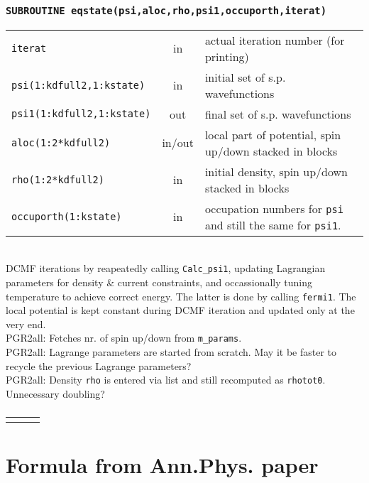 \documentclass[final,1p]{elsarticle}
\newcommand{\PGRcomm}[1]{{\color{blue}\small PGR2all: #1}}
\begin{document}
\subsubsection*{\tt SUBROUTINE eqstate(psi,aloc,rho,psi1,occuporth,iterat)}
\begin{tabular}{lcl}
 {\tt iterat} & in & actual iteration number (for printing)\\
 {\tt psi(1:kdfull2,1:kstate)} & in & initial set of
 s.p. wavefunctions\\
 {\tt psi1(1:kdfull2,1:kstate)} & out & final set of s.p. wavefunctions\\
 {\tt aloc(1:2*kdfull2)} & in/out & local part of potential, spin
 up/down stacked in blocks\\
 {\tt rho(1:2*kdfull2)} & in & initial density, spin
 up/down stacked in blocks \\
 {\tt occuporth(1:kstate)} & in & occupation numbers for {\tt psi} and
 still the same for {\tt psi1}.\\
\end{tabular}
\\[4pt]
DCMF iterations by reapeatedly calling {\tt Calc\_psi1},
updating Lagrangian parameters for density \& current constraints, and
occassionally tuning temperature to achieve correct energy. The
latter is done by calling {\tt fermi1}. The local potential
is kept constant during DCMF iteration and updated only at the very end.
\\
\PGRcomm{Fetches nr. of spin up/down from {\tt m\_params}.}
\\
\PGRcomm{Lagrange parameters are started from scratch. May it be
  faster to recycle the previous Lagrange parameters?
}
\\
\PGRcomm{Density {\tt rho} is entered via list and still recomputed
as {\tt rhotot0}. Unnecessary doubling?}


\subsubsection*{\tt }
\begin{tabular}{lcl}
 {\tt } &  &\\
\end{tabular}





\section{Formula from Ann.Phys. paper}
\end{document}
